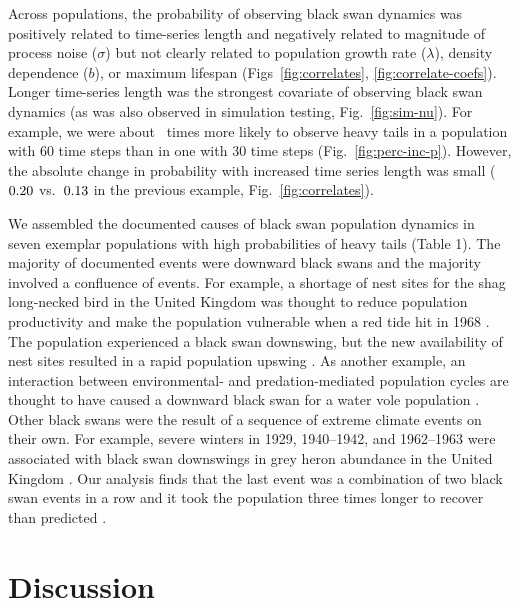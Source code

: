 Across populations, the probability of observing black swan dynamics was
positively related to time-series length and negatively related to magnitude of
process noise ($\sigma$) but not clearly related to population growth rate
($\lambda$), density dependence ($b$), or maximum lifespan
(Figs~\ref{fig:correlates}, \ref{fig:correlate-coefs}). Longer time-series
length was the strongest covariate of observing black swan dynamics (as was
also observed in simulation testing, Fig.~\ref{fig:sim-nu}). For example,
we were about \pIncHeavyNThirtyNSixty~times more likely to observe heavy tails
in a population with 60 time steps than in one with 30 time steps
(Fig.~\ref{fig:perc-inc-p}). However, the absolute change in probability with
increased time series length was small ($0.20$ vs.\
$0.13$ in the previous example, Fig.~\ref{fig:correlates}).

We assembled the documented causes of black swan population dynamics in seven
exemplar populations with high probabilities of heavy tails (Table 1). The
majority of documented events were downward black swans and the majority
involved a confluence of events. For example, a shortage of nest sites for the
shag long-necked bird in the United Kingdom was thought to reduce population
productivity and make the population vulnerable when a red tide hit in 1968
\citep{potts1980}. The population experienced a black swan downswing, but the
new availability of nest sites resulted in a rapid population upswing
\citep{potts1980}. As another example, an interaction between environmental-
and predation-mediated population cycles are thought to have caused a downward
black swan for a water vole population \citep{saucy1994}. Other black swans
were the result of a sequence of extreme climate events on their own. For
example, severe winters in 1929, 1940--1942, and 1962--1963 were associated
with black swan downswings in grey heron abundance in the United Kingdom
\citep{stafford1971}. Our analysis finds that the last event was a combination
of two black swan events in a row and it took the population three times longer
to recover than predicted \citep{stafford1971}.

\section{Discussion}


